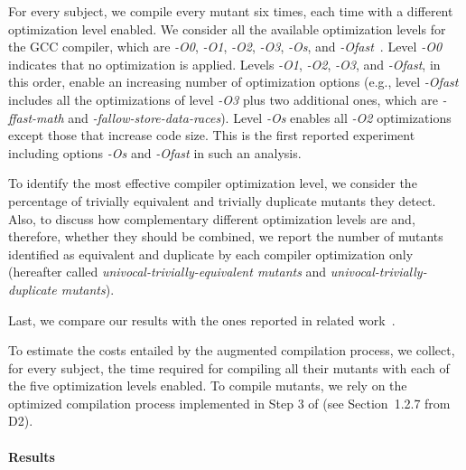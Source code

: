 For every subject, we compile every mutant six times, each time with a different optimization level enabled. We consider all the available optimization levels for the GCC compiler, which are \emph{-O0}, \emph{-O1}, \emph{-O2}, \emph{-O3}, \emph{-Os},
and \emph{-Ofast}~\cite{GCCopt}. Level \emph{-O0} indicates that no optimization is applied. Levels \emph{-O1}, \emph{-O2}, \emph{-O3}, and \emph{-Ofast}, in this order, enable an increasing number of optimization options (e.g., level \emph{-Ofast} includes all the optimizations of level \emph{-O3} plus two additional ones, which are \emph{-ffast-math} and \emph{-fallow-store-data-races}). Level \emph{-Os} enables all \emph{-O2} optimizations except those that increase code size. This is the first reported experiment including options \emph{-Os} and \emph{-Ofast} in such an analysis.
 

To identify the most effective compiler optimization level, we consider the percentage of trivially equivalent and trivially duplicate mutants they detect. Also, to discuss how complementary different optimization levels  are and, therefore, whether they should be combined, we report the number of mutants identified as equivalent and duplicate by each compiler optimization only (hereafter called \emph{univocal-trivially-equivalent mutants} and \emph{univocal-trivially-duplicate mutants}). 

Last, we compare our results with the ones reported in related work~\cite{papadakis2015trivial}.

To estimate the costs entailed by the augmented compilation process, we collect, for every subject, the time required for compiling all their mutants with each of the five optimization levels enabled. To compile mutants, we rely on the optimized compilation process implemented in Step 3 of \APPR (see Section~1.2.7 from D2).



\paragraph{Results}

